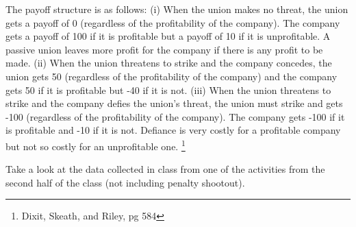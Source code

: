 \documentclass[addpoints ]{exam}
\begin{document}
\begin{questions}
The payoff structure is as follows: (i) When the union makes no threat, the
union gets a payoff of 0 (regardless of the profitability of the company). The
company gets a payoff of 100 if it is profitable but a payoff of 10 if it is
unprofitable. A passive union leaves more profit for the company if there is
any profit to be made. (ii) When the union threatens to strike and the company
concedes, the union gets 50 (regardless of the profitability of the company)
and the company gets 50 if it is profitable but -40 if it is not. (iii) When
the union threatens to strike and the company defies the union’s threat, the
union must strike and gets -100 (regardless of the profitability of the
company). The company gets -100 if it is profitable and -10 if it is not.
Defiance is very costly for a profitable company but not so costly for an
unprofitable one.
\footnote{Dixit, Skeath, and Riley, pg 584}



\newpage

\question 
 
Take a look at the data collected in class from one of the activities from the second half of the class
(not including penalty shootout).
 

\end{questions}
\end{document}
